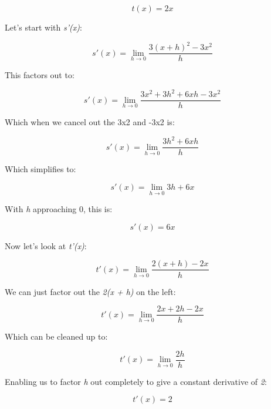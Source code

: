 \documentclass[11pt]{article}
\begin{document}
\begin{equation}t(x) = 2x\end{equation}

Let's start with \emph{s'(x)}:

\begin{equation}s'(x) = \lim_{h \to 0} \frac{3(x + h)^{2} - 3x^{2}}{h} \end{equation}

This factors out to:

\begin{equation}s'(x) = \lim_{h \to 0} \frac{3x^{2} + 3h^{2} + 6xh - 3x^{2}}{h} \end{equation}

Which when we cancel out the 3x2 and -3x2 is:

\begin{equation}s'(x) = \lim_{h \to 0} \frac{3h^{2} + 6xh}{h} \end{equation}

Which simplifies to:

\begin{equation}s'(x) = \lim_{h \to 0} 3h + 6x \end{equation}

With \emph{h} approaching 0, this is:

\begin{equation}s'(x) = 6x \end{equation}

Now let's look at \emph{t'(x)}:

\begin{equation}t'(x) = \lim_{h \to 0} \frac{2(x + h) - 2x}{h} \end{equation}

We can just factor out the \emph{2(x + h)} on the left:

\begin{equation}t'(x) = \lim_{h \to 0} \frac{2x + 2h - 2x}{h} \end{equation}

Which can be cleaned up to:

\begin{equation}t'(x) = \lim_{h \to 0} \frac{2h}{h} \end{equation}

Enabling us to factor \emph{h} out completely to give a constant
derivative of \emph{2}:

\begin{equation}t'(x) = 2 \end{equation}
\end{document}
